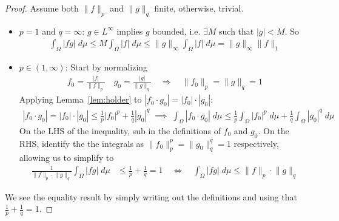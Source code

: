 \documentclass[12pt]{article}
\theoremstyle{plain}
\theoremstyle{definition}
\theoremstyle{remark}
\begin{document}
\begin{proof}
Assume both $\lVert f\rVert_p$ and $\lVert g\rVert_q$ finite,
otherwise, trivial.
\begin{itemize}
  \item $p=1$ and $q=\infty$:
    $g\in L^{\infty}$ implies $g$ bounded, i.e. $\exists M$ such
    that $|g|<M$. So
    \begin{align*}
        \int_\Omega |fg| \; d\mu \leq
        M\int_\Omega |f| \; d\mu \leq
        \lVert g\rVert_\infty\int_\Omega |f| \; d\mu
        =
        \lVert g\rVert_\infty\lVert f\rVert_1
    \end{align*}

  \item $p\in(1,\infty)$:
    Start by normalizing
    \begin{align*}
        f_0 = \frac{|f|}{\lVert f\rVert_p}
        \quad
        g_0 = \frac{|g|}{\lVert g\rVert_{q}}
        \quad \Rightarrow\quad
        \lVert f_0\rVert_p = \lVert g\rVert_{q}=1
    \end{align*}
    Applying Lemma~\ref{lem:holder} to $|f_0\cdot g_0|=|f_0|\cdot|g_0|$:
    \begin{align*}
      |f_0 \cdot g_0|=|f_0|\cdot|g_0|\leq
      \frac{1}{p} |f_0|^p
      +\frac{1}{q} |g_0|^{q}
      \;\implies\;
      \int_\Omega
      |f_0\cdot g_0|\;d\mu\leq
      \frac{1}{p}
      \int_\Omega |f_0|^p \;d\mu
      +\frac{1}{q}\int_\Omega |g_0|^{q}\;d\mu
    \end{align*}
    On the LHS of the inequality, sub in the definitions of $f_0$
    and $g_0$. On the RHS,
    identify the the integrals as
    $\lVert f_0\rVert^{p}_p=\lVert g_0\rVert^{q}_q=1$
    respectively, allowing us to simplify to
    \begin{align*}
        \frac{1}{\lVert f\rVert_p \cdot \lVert g\rVert_{q}}
        \int_\Omega
        |f g|\;d\mu
        &\leq
        \frac{1}{p} + \frac{1}{q}=1
        \quad\iff\quad
        \int_\Omega
        |f g|\;d\mu
        \leq
        {\lVert f\rVert_p \cdot \lVert g\rVert_{q}}
    \end{align*}
\end{itemize}
We see the equality result by simply writing out the definitions and
using that $\frac{1}{p}+\frac{1}{q}=1$.
\end{proof}
\end{document}
